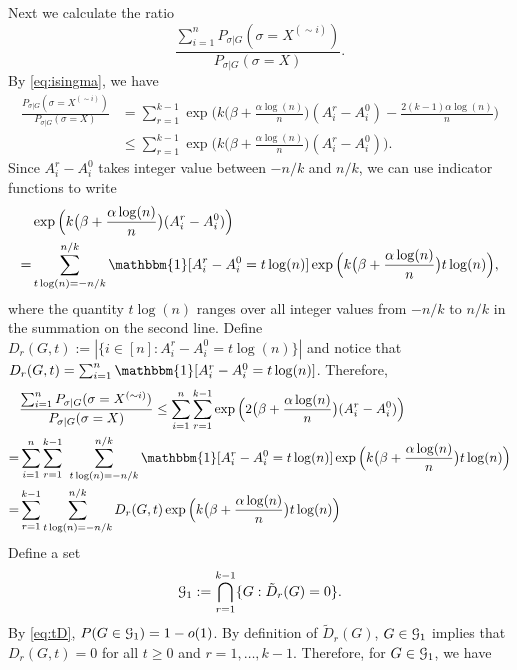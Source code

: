 \documentclass{article}
\begin{document}
Next we calculate the ratio
$$
\frac{\sum_{i=1}^n P_{\sigma|G}(\sigma=X^{(\sim i)} )}
{P_{\sigma|G}(\sigma=X)} .
$$
By \eqref{eq:isingma}, we have
\begin{align*}
\frac{P_{\sigma|G}(\sigma=X^{(\sim i)} )}
{P_{\sigma|G}(\sigma=X)}
& = \sum_{r=1}^{k-1}\exp\Big(k\big(\beta+\frac{\alpha\log(n)}{n} \big) (A^r_i-A^0_i)
-\frac{2(k-1)\alpha\log(n)}{n} \Big) \\
& \le \sum_{r=1}^{k-1}\exp\Big(k\big(\beta+\frac{\alpha\log(n)}{n} \big) (A^r_i-A^0_i) \Big)  .
\end{align*}
Since $A^r_i-A^0_i$ takes integer value between $-n/k$ and $n/k$,
we can use indicator functions to write
\begin{align*}
& \exp\Big(k\big(\beta+\frac{\alpha\log(n)}{n} \big) (A^r_i-A^0_i) \Big) \\
= & \sum_{t\log(n)=-n/k}^{n/k}
\mathbbm{1}[A^r_i-A^0_i=t \log(n)] \exp\Big(k\big(\beta+\frac{\alpha\log(n)}{n} \big) t \log(n) \Big) ,
\end{align*}
where the quantity $t\log(n)$ ranges over all integer values from $-n/k$ to $n/k$ in the summation on the second line.
Define $D_r(G,t):=|\{i\in[n]:A^r_i-A^0_i= t\log(n)\}|$ and notice that $D_r(G,t)=\sum_{i=1}^n \mathbbm{1}[A^r_i-A^0_i=t \log(n)]$.
Therefore,
\begin{equation}  \label{eq:fd}
\begin{aligned}
 & \frac{\sum_{i=1}^n P_{\sigma|G}(\sigma=X^{(\sim i)} )}
{P_{\sigma|G}(\sigma=X)}
\le \sum_{i=1}^n \sum_{r=1}^{k-1} \exp\Big(2\big(\beta+\frac{\alpha\log(n)}{n} \big) (A^r_i-A^0_i) \Big) \\
= & \sum_{i=1}^n\sum_{r=1}^{k-1}
\hspace*{0.05in}
\sum_{t\log(n)=-n/k}^{n/k}
\mathbbm{1}[A^r_i-A^0_i=t \log(n)] \exp\Big(k\big(\beta+\frac{\alpha\log(n)}{n} \big) t \log(n) \Big) \\
= & \sum_{r=1}^{k-1}\sum_{t\log(n)=-n/k}^{n/k}
D_r(G,t) \exp\Big(k\big(\beta+\frac{\alpha\log(n)}{n} \big) t \log(n) \Big)
\end{aligned}
\end{equation}
Define a set 
$$
\mathcal{G}_1:=\bigcap_{r=1}^{k-1} \{G:\tilde{D}_r(G)=0\}.
$$
By \eqref{eq:tD}, $P(G\in\mathcal{G}_1)= 1-o(1)$. By definition of $\tilde{D}_r(G)$, $G\in\mathcal{G}_1$ implies that $D_r(G,t)=0$ for all $t\ge 0$ and $r=1,\dots,k-1$. Therefore, for $G\in\mathcal{G}_1$, we have
\end{document}
